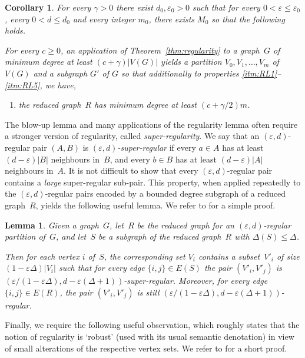 \documentclass[final]{article}
\def\mcite[#1]#2{\mbox{\cite[#1]{#2}}}
\newtheorem{lemma}[theorem]{Lemma}
\newtheorem{cor}{Corollary}[theorem]
\theoremstyle{definition}
\newcommand{\itmarab}[1]{\mbox{\rm 
({\it #1}\,\arabic{*}\hspace{0.05em})}}
\newcommand{\eps}{\varepsilon}
\begin{document}
\begin{cor}
  \label{cor:reduced-min-degree}
  For every $\gamma>0$ there exist $d_0, \eps_0>0$ such that for every $0<\eps\leq \eps_0$, every $0 < d \leq d_0$ and every integer $m_0$, there exists $M_0$ so that the
  following holds.

  For every $c \geq 0$, an application of Theorem~\ref{thm:regularity} to a graph~$G$ of minimum degree at least $(c +\gamma)|V(G)|$ yields a partition $V_0, V_1,\dots,V_m$ of $V(G)$ and a subgraph $G'$ of $G$ so that additionally to properties \ref{itm:RL1}--\ref{itm:RL5}, we have,
  \begin{enumerate}[label=\itmarab{RL}, start = 6]
  \item \label{itm:RL6} the reduced graph~$R$ has minimum degree at least
    $(c +\gamma/2)m$.
  \end{enumerate}
\end{cor}

The blow-up lemma and many applications of the regularity lemma often require a stronger version of regularity, called \emph{super-regularity}. We say that an $(\eps, d)$-regular pair $(A, B)$ is $(\eps,d)$\emph{-super-regular} if every $a \in A$ has at least $(d-\eps)|B|$ neighbours in~$B$, and every $b \in B$ has at least $(d-\eps)|A|$ neighbours in~$A$. It is not difficult to show that every $(\eps,d)$-regular pair contains a \emph{large} super-regular sub-pair. This property, when applied repeatedly to the $(\eps, d)$-regular pairs encoded by a bounded degree subgraph of a reduced graph~$R$, yields the following useful lemma. We refer to \mcite[Proposition 8]{kuhn_osthus_planar_subgraph} for a simple proof.

\begin{lemma}
  \label{lem:super-regularity}
  Given a graph~$G$, let~$R$ be the reduced graph for an $(\eps, d)$-regular partition of~$G$, and let~$S$ be a subgraph of the reduced graph~$R$ with $\Delta(S)\leq \Delta$. 
  
  Then for each vertex $i$ of~$S$, the corresponding set $V_i$ contains a subset~$V'_i$ of size $(1-\eps\Delta)|V_i|$ such that for every edge $\{i,j\}\in E(S)$ the pair $(V'_i,V'_j)$ is ${(\eps/(1-\eps\Delta), d-\eps(\Delta+1))}$-super-regular.  Moreover, for every edge $\{i,j\} \in E(R)$, the pair $(V'_i,V'_j)$ is still $(\eps/(1-\eps\Delta), d-\eps(\Delta+1))$-regular.
\end{lemma}
%

Finally, we require the following useful observation, which roughly states that the notion of regularity is `robust' (used with its usual semantic denotation) in view of small alterations of the respective vertex sets. We refer to \mcite[Proposition~8]{Boettcher_robust_regularity_proof} for a short proof.
\end{document}
